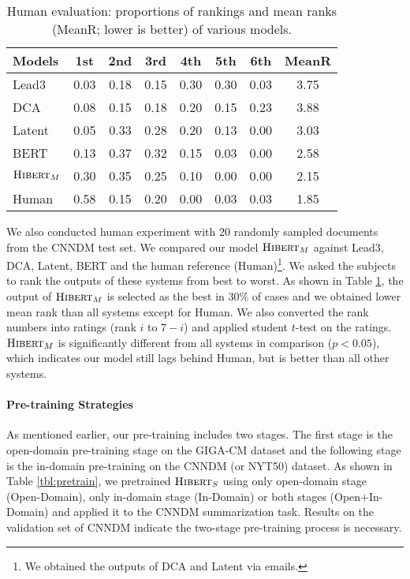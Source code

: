 \documentclass[11pt,a4paper]{article}
\begin{document}
\begin{table}[t]
	\centering
	\small
	\setlength\tabcolsep{3.5pt} 
	\begin{tabular}[t]{| l | c c c c c c | c |}
		\hline
		Models & 1st & 2nd & 3rd & 4th & 5th & 6th & MeanR \\
		\hline
		\hline
		Lead3 & 0.03 & 0.18 & 0.15 & 0.30 & 0.30 & 0.03 & 3.75 \\
		DCA & 0.08 & 0.15 & 0.18 & 0.20 & 0.15 & 0.23 & 3.88 \\ 
		Latent & 0.05 & 0.33 & 0.28 & 0.20 & 0.13 & 0.00 & 3.03 \\
		BERT & 0.13 & 0.37 & 0.32 & 0.15 &  0.03 & 0.00 & 2.58 \\
		$\text{\sc Hibert}_M$  & 0.30  & 0.35  & 0.25 & 0.10 & 0.00 & 0.00 & 2.15  \\
		Human  & 0.58 & 0.15 & 0.20 & 0.00 & 0.03 & 0.03 & 1.85 \\
		\hline
	\end{tabular}
	\caption{Human evaluation: proportions of rankings and mean ranks (MeanR; lower is better) of various models.}
	\label{tbl:human}
\end{table}

We also conducted human experiment with 20 randomly sampled documents from the CNNDM test set. We compared our model $\text{\sc Hibert}_M$ against Lead3, DCA, Latent, BERT and the human reference (Human)\footnote{We obtained the outputs of DCA and Latent via emails.}. We asked the subjects to rank the outputs of these systems from best to worst. As shown in Table \ref{tbl:human}, the output of $\text{\sc Hibert}_M$ is selected as the best in 30\% of cases and we obtained lower mean rank than all systems except for \mbox{Human}. We also converted the rank numbers into ratings (rank $i$ to $7-i$) and applied student $t$-test on the ratings. $\text{\sc Hibert}_M$ is significantly different from all systems in comparison ($p < 0.05$), which indicates our model still lags behind Human, but is better than all other systems.

\paragraph{Pre-training Strategies}
As mentioned earlier, our pre-training includes two stages. The first stage is the open-domain pre-training stage on the GIGA-CM dataset and the following stage is the in-domain pre-training on the \mbox{CNNDM} (or NYT50) dataset. As shown in Table \ref{tbl:pretrain}, we pretrained $\text{\sc Hibert}_S$ using only open-domain stage (Open-Domain), only in-domain stage (In-Domain) or both stages (Open+In-Domain) and applied it to the CNNDM summarization task. Results on the validation set of CNNDM indicate the two-stage pre-training process is necessary.
\end{document}
